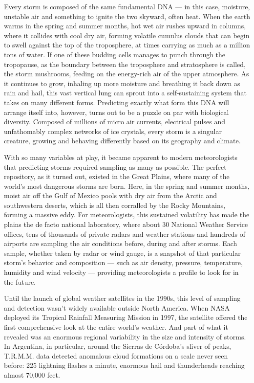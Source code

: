 Every storm is composed of the same fundamental DNA --- in this case,
moisture, unstable air and something to ignite the two skyward, often
heat. When the earth warms in the spring and summer months, hot wet air
rushes upward in columns, where it collides with cool dry air, forming
volatile cumulus clouds that can begin to swell against the top of the
troposphere, at times carrying as much as a million tons of water. If
one of these budding cells manages to punch through the tropopause, as
the boundary between the troposphere and stratosphere is called, the
storm mushrooms, feeding on the energy-rich air of the upper atmosphere.
As it continues to grow, inhaling up more moisture and breathing it back
down as rain and hail, this vast vertical lung can sprout into a
self-sustaining system that takes on many different forms. Predicting
exactly what form this DNA will arrange itself into, however, turns out
to be a puzzle on par with biological diversity. Composed of millions of
micro air currents, electrical pulses and unfathomably complex networks
of ice crystals, every storm is a singular creature, growing and
behaving differently based on its geography and climate.

With so many variables at play, it became apparent to modern
meteorologists that predicting storms required sampling as many as
possible. The perfect repository, as it turned out, existed in the Great
Plains, where many of the world's most dangerous storms are born. Here,
in the spring and summer months, moist air off the Gulf of Mexico pools
with dry air from the Arctic and southwestern deserts, which is all then
corralled by the Rocky Mountains, forming a massive eddy. For
meteorologists, this sustained volatility has made the plains the de
facto national laboratory, where about 30 National Weather Service
offices, tens of thousands of private radars and weather stations and
hundreds of airports are sampling the air conditions before, during and
after storms. Each sample, whether taken by radar or wind gauge, is a
snapshot of that particular storm's behavior and composition --- such as
air density, pressure, temperature, humidity and wind velocity ---
providing meteorologists a profile to look for in the future.

Until the launch of global weather satellites in the 1990s, this level
of sampling and detection wasn't widely available outside North America.
When NASA deployed its Tropical Rainfall Measuring Mission in 1997, the
satellite offered the first comprehensive look at the entire world's
weather. And part of what it revealed was an enormous regional
variability in the size and intensity of storms. In Argentina, in
particular, around the Sierras de Córdoba's sliver of peaks, T.R.M.M.
data detected anomalous cloud formations on a scale never seen before:
225 lightning flashes a minute, enormous hail and thunderheads reaching
almost 70,000 feet.

